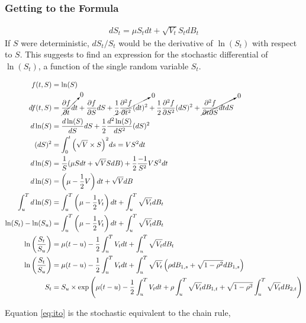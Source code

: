 \documentclass[12pt,twoside]{reedthesis}
\theoremstyle{definition}
\theoremstyle{definition}
\theoremstyle{remark}
\begin{document}
  \subsubsection{Getting to the Formula}\label{getting-to-the-formula}
  \begin{align}
  dS_t = \mu S_t dt + \sqrt{V_t} S_t dB_t
  \end{align}
  If \(S\) were deterministic, \(dS_t/S_t\) would be the derivative of
  \(\ln(S_t)\) with respect to \(S\). This suggests to find an expression
  for the stochastic differential of \(\ln(S_t)\), a function of the
  single random variable \(S_t\).
  \begin{scriptsize}
  \begin{align}
  f(t,S) &= \ln(S) \\
  df(t,S) &= \cancelto{0}{\frac{\partial f}{\partial t}dt}  + \frac{\partial f}{\partial S} dS + \cancelto{0}{\frac{1}{2} \frac{\partial^2 f}{\partial t^2} (dt)^2} + \frac{1}{2} \frac{\partial^2 f}{\partial S^2} (dS)^2  + \cancelto{0}{\frac{\partial^2 f}{\partial t \partial S} dt dS} \\
  d\ln(S) &= \frac{d\ln(S)}{dS} dS + \frac{1}{2} \frac{d^2\ln(S)}{dS^2}(dS)^2 \\
  (dS)^2 &= \int_{0}^{t}{\left(\sqrt{V} \times S \right)^2} ds = V S^2 dt \\
  d\ln(S) &= \frac{1}{S} (\mu S dt + \sqrt{V} S dB) + \frac{1}{2}\frac{-1}{S^2} V S^2 dt \\
  d\ln(S) &= \left( \mu -  \frac{1}{2} V \right) dt + \sqrt{V} dB \\
  \int_{u}^{T}{d\ln(S)} &= \int_{u}^{T}{\left( \mu - \frac{1}{2} V_t \right) dt} + \int_{u}^{T}{\sqrt{V_t}dB_t} \\
  \ln(S_t) - \ln(S_u) &= \int_{u}^{T}{\left( \mu - \frac{1}{2} V_t \right) dt} + \int_{u}^{T}{\sqrt{V_t}dB_t} \\
  \ln \left( \frac{S_t}{S_u} \right) &= \mu (t-u) - \frac{1}{2}\int_{u}^{T}{V_t dt} + \int_{u}^{T}{\sqrt{V_t} dB_t} \\
  \ln \left( \frac{S_t}{S_u} \right) &= \mu (t-u) - \frac{1}{2}\int_{u}^{T}{V_t dt} + \int_{u}^{T}{\sqrt{V_t} \left(\rho dB_{1,s} + \sqrt{1-\rho^2} dB_{1,s} \right)} \\
  S_t &= S_u \times \exp \left( \mu (t-u) - \frac{1}{2} \int_{u}^{T}{V_t dt} + \rho \int_{u}^{T}{\sqrt{V_t}dB_{1,t}}+ \sqrt{1 - \rho^2} \int_{u}^{T}{\sqrt{V_t}dB_{2,t}} \right)
  \end{align}
  \end{scriptsize}
  Equation \eqref{eq:ito} is the stochastic equivalent to the chain rule,
\end{document}
